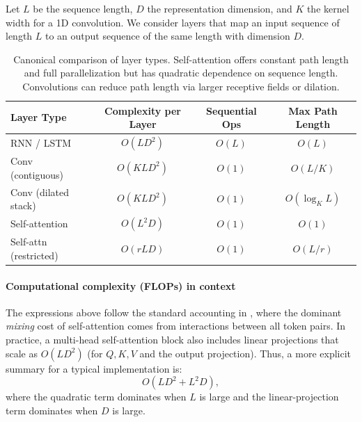 \noindent
Let \(L\) be the sequence length, \(D\) the representation dimension, and \(K\) the kernel width for a 1D convolution.
We consider layers that map an input sequence of length \(L\) to an output sequence of the same length with dimension \(D\).

\begin{table}[t]
	\centering
	\renewcommand{\arraystretch}{1.15}
	\begin{tabular}{l c c c}
		\hline
		\textbf{Layer Type} & \textbf{Complexity per Layer} & \textbf{Sequential Ops} & \textbf{Max Path Length} \\
		\hline
		RNN / LSTM & \(O(LD^2)\) & \(O(L)\) & \(O(L)\) \\
		Conv (contiguous) & \(O(KLD^2)\) & \(O(1)\) & \(O(L/K)\) \\
		Conv (dilated stack) & \(O(KLD^2)\) & \(O(1)\) & \(O(\log_K L)\) \\
		Self-attention & \(O(L^2D)\) & \(O(1)\) & \(O(1)\) \\
		Self-attn (restricted) & \(O(rLD)\) & \(O(1)\) & \(O(L/r)\) \\
		\hline
	\end{tabular}
	\caption{Canonical comparison of layer types. Self-attention offers constant path length and full parallelization but has quadratic dependence on sequence length. Convolutions can reduce path length via larger receptive fields or dilation.}
	\label{tab:chapter17_complexity_comparison}
\end{table}

\paragraph{Computational complexity (FLOPs) in context}
\noindent
The expressions above follow the standard accounting in \cite{vaswani2017_attention}, where the dominant \emph{mixing} cost of self-attention comes from interactions between all token pairs.
In practice, a multi-head self-attention block also includes linear projections that scale as \(O(LD^2)\) (for \(Q,K,V\) and the output projection).
Thus, a more explicit summary for a typical implementation is:
\[
O(LD^2 + L^2D),
\]
where the quadratic term dominates when \(L\) is large and the linear-projection term dominates when \(D\) is large.

